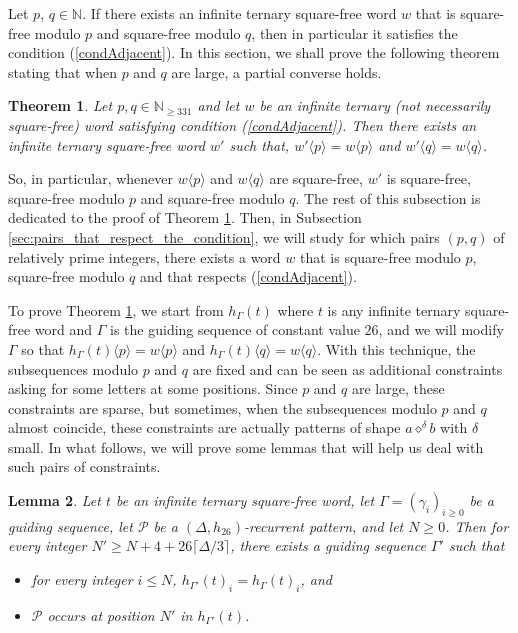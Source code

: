 \documentclass[12pt]{article}
\newtheorem{theorem}{Theorem}
\newtheorem{lemma}[theorem]{Lemma}
\theoremstyle{definition}
\newcommand{\patternprime}[3]{{#1}\diamond^{#2}{#3}}
\newcommand{\subsequence}[2]{#1\langle#2\rangle}
\begin{document}
Let $p$, $q \in \mathbb{N}$. If there exists an infinite ternary square-free word $w$ that is square-free modulo $p$ and square-free modulo $q$, then in particular it satisfies the condition (\ref{condAdjacent}). In this section, we shall prove the following theorem stating that when $p$ and $q$ are large, a partial converse holds.


\begin{theorem}\label{thm:sufficient_condition}
    Let $p, q \in \mathbb{N}_{\ge 331}$ and let $w$ be an infinite ternary (not necessarily square-free) word satisfying condition (\ref{condAdjacent}). 
    Then there exists an infinite ternary square-free word $w'$ such that, $\subsequence{w'}{p} = \subsequence{w}{p}$ and $\subsequence{w'}{q} = \subsequence{w}{q}$.
\end{theorem}

So, in particular, whenever $\subsequence{w}{p}$ and $\subsequence{w}{q}$ are square-free, $w'$ is square-free, square-free modulo $p$ and square-free modulo $q$. The rest of this subsection is dedicated to the proof of Theorem \ref{thm:sufficient_condition}. Then, in Subsection \ref{sec:pairs_that_respect_the_condition}, we will study for which pairs $(p, q)$ of relatively prime integers, there exists a word $w$ that is square-free modulo $p$, square-free modulo $q$ and that respects (\ref{condAdjacent}). 

To prove Theorem \ref{thm:sufficient_condition}, we start from $h_{\Gamma}(t)$ where $t$ is any infinite ternary square-free word and $\Gamma$ is the guiding sequence of constant value $26$, and we will modify $\Gamma$ so that $\subsequence{h_\Gamma(t)}{p} = \subsequence{w}{p}$ and $\subsequence{h_\Gamma(t)}{q} = \subsequence{w}{q}$. With this technique, the subsequences modulo $p$ and $q$ are fixed and can be seen as additional constraints asking for some letters at some positions. Since $p$ and $q$ are large, these constraints are sparse, but sometimes, when the subsequences modulo $p$ and $q$ almost coincide, these constraints are actually patterns of shape $\patternprime{a}{\delta}{b}$ with $\delta$ small. In what follows, we will prove some lemmas that will help us deal with such pairs of constraints.

\begin{lemma}\label{lemma:contraction_for_Delta_recurrent_patterns}
    Let $t$ be an infinite ternary square-free word, let $\Gamma = (\gamma_i)_{i \ge 0}$ be a guiding sequence, let $\mathcal{P}$ be a $(\Delta, h_{26})$-recurrent pattern, and let $N \ge 0$. Then for every integer $N' \ge N + 4 + 26\lceil \Delta/3\rceil$, there exists a guiding sequence $\Gamma'$ such that
    \begin{itemize}
        \item for every integer $i \le N$, $h_{\Gamma'}(t)_i = h_\Gamma(t)_i$, and
        \item $\mathcal{P}$ occurs at position $N'$ in $h_{\Gamma'}(t)$.
    \end{itemize} 
\end{lemma}
\end{document}
